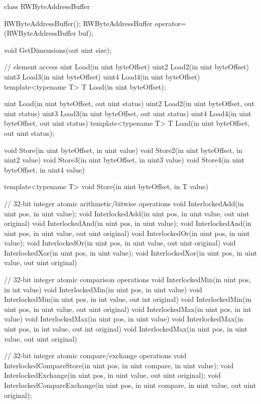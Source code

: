 \begin{HLSL}
 class RWByteAddressBuffer {

   RWByteAddressBuffer();
   RWByteAddressBuffer operator=(RWByteAddressBuffer buf);

   void GetDimensions(out uint size);

   // element access
   uint Load(in uint byteOffset)
   uint2 Load2(in uint byteOffset)
   uint3 Load3(in uint byteOffset)
   uint4 Load4(in uint byteOffset)
   template<typename T>
   T Load(in uint byteOffset);

   uint Load(in uint byteOffset, out uint status)
   uint2 Load2(in uint byteOffset, out uint status)
   uint3 Load3(in uint byteOffset, out uint status)
   uint4 Load4(in uint byteOffset, out uint status)
   template<typename T>
   T Load(in uint byteOffset, out uint status);

   void Store(in uint byteOffset, in uint value)
   void Store2(in uint byteOffset, in uint2 value)
   void Store3(in uint byteOffset, in uint3 value)
   void Store4(in uint byteOffset, in uint4 value)

   template<typename T>
   void Store(in uint byteOffset, in T value)

   // 32-bit integer atomic arithmetic/bitwise operations
   void InterlockedAdd(in uint pos, in uint value);
   void InterlockedAdd(in uint pos, in uint value, out uint original)
   void InterlockedAnd(in uint pos, in uint value);
   void InterlockedAnd(in uint pos, in uint value, out uint original)
   void InterlockedOr(in uint pos, in uint value);
   void InterlockedOr(in uint pos, in uint value, out uint original)
   void InterlockedXor(in uint pos, in uint value);
   void InterlockedXor(in uint pos, in uint value, out uint original)

   // 32-bit integer atomic comparison operations
   void InterlockedMin(in uint pos, in int value)
   void InterlockedMin(in uint pos, in uint value)
   void InterlockedMin(in uint pos, in int value, out int original)
   void InterlockedMin(in uint pos, in uint value, out uint original)
   void InterlockedMax(in uint pos, in int value)
   void InterlockedMax(in uint pos, in uint value)
   void InterlockedMax(in uint pos, in int value, out int original)
   void InterlockedMax(in uint pos, in uint value, out uint original)

   // 32-bit integer atomic compare/exchange operations
   void InterlockedCompareStore(in uint pos, in uint compare, in uint value);
   void InterlockedExchange(in uint pos, in uint value, out uint original);
   void InterlockedCompareExchange(in uint pos, in uint compare, in uint value,
                                    out uint original);

}
\end{HLSL}
